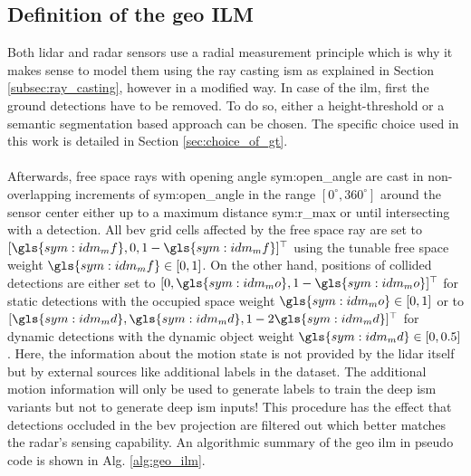 \subsection{Definition of the geo ILM}
\label{subsec:method_geo_ilm}
Both lidar and radar sensors use a radial measurement principle which is why it makes sense to model them using the ray casting \gls{ism} as explained in Section \ref{subsec:ray_casting}, however in a modified way. In case of the \gls{ilm}, first the ground detections have to be removed. To do so, either a height-threshold or a semantic segmentation based approach can be chosen. The specific choice used in this work is detailed in Section \ref{sec:choice_of_gt}.
\\\\
Afterwards, free space rays with opening angle \gls{sym:open_angle} are cast in non-overlapping increments of \gls{sym:open_angle} in the range $[0^\circ, 360^\circ]$ around the sensor center either up to a maximum distance \gls{sym:r_max} or until intersecting with a detection. All \gls{bev} grid cells affected by the free space ray are set to $[\gls{sym:idm_mf},0,1-\gls{sym:idm_mf}]^\top$ using the tunable free space weight $\gls{sym:idm_mf} \in [0,1]$. On the other hand, positions of collided detections are either set to $[0,\gls{sym:idm_mo},1-\gls{sym:idm_mo}]^\top$ for static detections with the occupied space weight $\gls{sym:idm_mo} \in [0,1]$ or to $[\gls{sym:idm_md}, \gls{sym:idm_md}, 1-2\gls{sym:idm_md}]^\top$ for dynamic detections with the dynamic object weight $\gls{sym:idm_md} \in [0,0.5]$. Here, the information about the motion state is not provided by the lidar itself but by external sources like additional labels in the dataset. The additional motion information will only be used to generate labels to train the deep \gls{ism} variants but not to generate deep \gls{ism} inputs! This procedure has the effect that detections occluded in the \gls{bev} projection are filtered out which better matches the radar's sensing capability. An algorithmic summary of the geo \gls{ilm} in pseudo code is shown in Alg. \ref{alg:geo_ilm}.
\\\\
